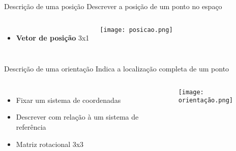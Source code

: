 \begin{frame}[c]{} 
   
    \begin{center}
    \end{center}
       
\end{frame}
\begin{frame}[t]{Descrição de uma posição}
    Descrever a posição de um ponto no espaço
    \vspace*{0.3cm}
    \begin{columns}
        \begin{itemize}
            \item \textbf{Vetor de posição} 3x1
        \end{itemize}
            \centering
            \texttt{[image: posicao.png]}
    \end{columns}
\end{frame}
\begin{frame}[c]{Descrição de uma orientação}
    Indica a localização completa de um ponto
    \begin{columns}
        \begin{itemize}
            \item Fixar um sistema de coordenadas
            \item Descrever com relação à um sistema de referência
            \item Matriz rotacional 3x3
        \end{itemize}
            \centering
            \texttt{[image: orientação.png]}
    \end{columns}
\end{frame}
